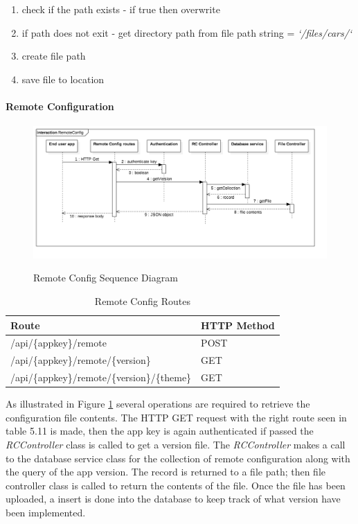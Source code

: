\begin{enumerate}
  \item check if the path exists
  - if true then overwrite 
  \item if path does not exit
  - get directory path from file path string = \textit{`/files/cars/`}
  \item create file path
  \item save file to location
\end{enumerate}


\paragraph{Remote Configuration}

\begin{figure}[!h]
    \caption{Remote Config Sequence Diagram}
    \centering
    \includegraphics[width=150mm]{images/sequence/RemoteConfig}
    \label{fig:rc-seq}
\end{figure}

\begin{table}[!h]
\centering
\caption{Remote Config Routes}
\label{tb:rc-routes}
\begin{tabular}{|l|l|}
\hline
\rowcolor{green!20}
Route                                        & HTTP Method \\ \hline
/api/\{appkey\}/remote                       & POST        \\ \hline
/api/\{appkey\}/remote/\{version\}           & GET         \\ \hline
/api/\{appkey\}/remote/\{version\}/\{theme\} & GET         \\ \hline
\end{tabular}
\end{table}

As illustrated in Figure \ref{fig:rc-seq} several operations are required to retrieve the configuration file contents. The HTTP GET request with the right route seen in table 5.11 is made, then the app key is again authenticated if passed the \textit{RCController} class is called to get a version file. The \textit{RCController} makes a call to the database service class for the collection of remote configuration along with the query of the app version. The record is returned to a file path; then file controller class is called to return the contents of the file. Once the file has been uploaded, a insert is done into the database to keep track of what version have been implemented.

